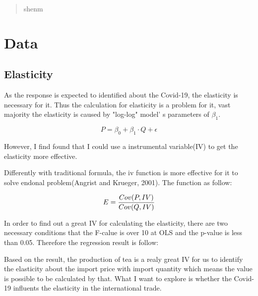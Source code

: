 \documentclass[12pt]{article}
\begin{document}
\begin{abstract}
    shenm
\end{abstract}
\section{Data}
\subsection{Elasticity}
As the response is expected to identified about the Covid-19, the elasticity is necessary for it.
Thus the calculation for elasticity is a problem for it, vast majority the elasticity is caused by "log-log" model' s parameters of $\beta_1$.

$$P = \beta_0 + \beta_1 \cdot Q + \epsilon$$

However, I find found that I could use a instrumental variable(IV) to get the elasticity more effective.

Differently with traditional formula, the iv function is more effective for it to solve endonal problem(Angrist and Krueger, 2001). The function as follow:

$$E = {Cov(P, IV) \over Cov(Q, IV)}$$

In order to find out a great IV for calculating the elasticity, there are two necessary conditions that the F-calue is over 10 at OLS and the p-value is less than 0.05.
Therefore the regression result is follow:


Based on the result, the production of tea is a realy great IV for us to identify the elasticity about the import price with import quantity which means the value is possible to be calculated by that.
What I want to explore is whether the Covid-19 influents the elasticity in the international trade.
\end{document}
